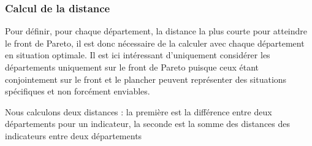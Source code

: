 \documentclass[
  french,
  11pt,
  a4paper,
]{article}
\begin{document}
\subsubsection{Calcul de la distance}\label{calcul-de-la-distance}

Pour définir, pour chaque département, la distance la plus courte pour
atteindre le front de Pareto, il est donc nécessaire de la calculer avec
chaque département en situation optimale. Il est ici intéressant
d'uniquement considérer les départements uniquement sur le front de
Pareto puisque ceux étant conjointement sur le front et le plancher
peuvent représenter des situations spécifiques et non forcément
enviables.

Nous calculons deux distances : la première est la différence entre deux
départements pour un indicateur, la seconde est la somme des distances
des indicateurs entre deux départements
\end{document}
